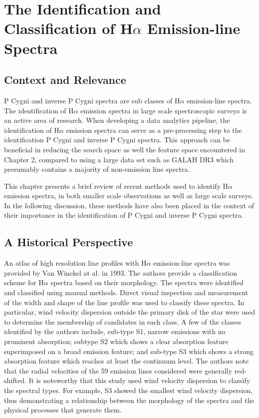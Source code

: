 \chapter{The Identification and Classification of H$\alpha$ Emission-line Spectra}

\section{Context and Relevance}
P Cygni and inverse P Cygni spectra are sub classes of H$\alpha$ emission-line spectra\cite{zhang2021catalog}. The identification of H$\alpha$ emission spectra in large scale spectroscopic surveys is an active area of research\cite{zhang2021catalog}\cite{vcotar2021galah}\cite{traven2015gaia}. When developing a data analytics pipeline, the identification of H$\alpha$ emission spectra can serve as a pre-processing step to the identification P Cygni and inverse P Cygni spectra. This approach can be beneficial in reducing the search space as well the feature space encountered in Chapter 2, compared to using a large data set such as GALAH DR3 which presumably contains a majority of non-emission line spectra. 

This chapter presents a brief review of recent methods used to identify H$\alpha$ emission spectra, in both smaller scale observations as well as large scale surveys. In the following discussion, these methods have also been placed in the context of their importance in the identification of P Cygni and inverse P Cygni spectra.

\section{A Historical Perspective}
An atlas of high resolution line profiles with H$\alpha$ emission-line spectra was provided by Van Winckel at al. in 1993\cite{van1993atlas}. The authors provide a classification scheme for H$\alpha$ spectra based on their morphology. The spectra were identified and classified using manual methods. Direct visual inspection and measurement of the width and shape of the line profile was used to classify these spectra. In particular, wind velocity dispersion outside the primary disk of the star were used to determine the membership of candidates in each class.
A few of the classes identified by the authors include, sub-type S1, narrow emissions with no prominent absorption; subtype S2 which shows a clear absorption feature superimposed on a broad emission feature; and sub-type S3 which shows a strong absorption feature which reaches at least the continuum level. The authors note that the radial velocities of the 59 emission lines considered were generally red-shifted. It is noteworthy that this study used wind velocity dispersion to classify the spectral types. For example, S3 showed the smallest wind velocity dispersion, thus demonstrating a relationship between the morphology of the spectra and the physical processes that generate them.

